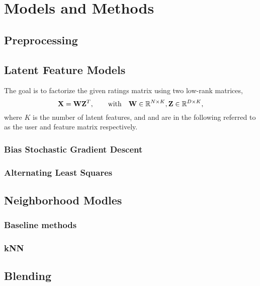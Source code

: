 \section{Models and Methods}

\subsection{Preprocessing}



\subsection{Latent Feature Models}
\label{sec:methods}

The goal is to factorize the given ratings matrix using two low-rank matrices, 
\begin{equation}
  \mathbf{X} = \mathbf{W}\mathbf{Z}^T ,\hspace{2em} \text{with} \hspace{1em} \mathbf{W} \in\mathbb{R}^{N \times K},
  \mathbf{Z} \in\mathbb{R}^{D \times K}, 
\end{equation}
where $K$ is the number of latent features, and  and  are in the following
referred to as the user and feature matrix respectively.

\subsubsection{Bias Stochastic Gradient Descent}


\subsubsection{Alternating Least Squares}


\subsection{Neighborhood Modles}

\subsubsection{Baseline methods}


\subsubsection{kNN}


\subsection{Blending}
\label{sec:blending}


